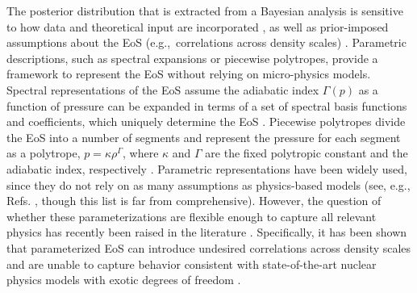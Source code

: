\documentclass[aps,prd,nofootinbib,tightenlines,notitlepage,floatfix,superscriptaddress,showkeys,twocolumn]{revtex4-1}
\begin{document}
The posterior distribution that is extracted from a Bayesian analysis is sensitive to how data and theoretical input are incorporated \cite{Miller:2019nzo}, as well as prior-imposed assumptions about the EoS (e.g.,~correlations across density scales) \cite{Greif:2018njt, Raaijmakers:2018bln, Riley:2018ekf,Legred:2022pyp}. Parametric descriptions, such as spectral expansions \cite{Lindblom:2010bb,Lindblom:2018rfr} or piecewise polytropes, provide a framework to represent the EoS without relying on micro-physics models. Spectral representations of the EoS assume the adiabatic index $\Gamma (p)$ as a function of pressure can be expanded in terms of a set of spectral basis functions and coefficients, which uniquely determine the EoS \cite{Lindblom:2010bb,Lindblom:2018rfr,Lindblom:2022mkr}. Piecewise polytropes divide the EoS into a number of segments and represent the pressure for each segment as a polytrope, $p = \kappa \rho^\Gamma$, where $\kappa$ and $\Gamma$ are the fixed polytropic constant and the adiabatic index, respectively \cite{Read:2008iy}. Parametric representations have been widely used, since they do not rely on as many assumptions as physics-based models (see, e.g., Refs. \cite{Raithel:2017ity,Annala:2023cwx,Annala:2021gom, Annala:2019puf,Annala:2017llu,Marczenko:2022cwq,Hebeler:2013nza,Miller:2019cac,Miller:2021qha,LIGOScientific:2018cki,Read:2008iy,Margalit:2017dij,Ozel:2015fia}, though this list is far from comprehensive). However, the question of whether these parameterizations are flexible enough to capture all relevant physics has recently been raised in the literature \cite{Greif:2018njt,Tan:2020ics,Legred:2022pyp}. Specifically, it has been shown that parameterized EoS can introduce undesired correlations across density scales \cite{Greif:2018njt,Legred:2022pyp} and are unable to capture behavior consistent with state-of-the-art nuclear physics models with exotic degrees of freedom \cite{Tan:2020ics}. 
\end{document}
